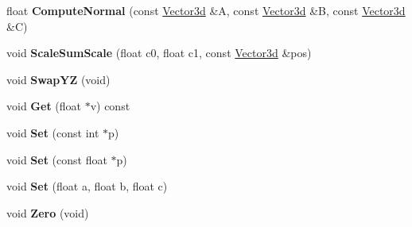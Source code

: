 \begin{DoxyCompactItemize}
\item 
\hypertarget{class_convex_decomposition_1_1_vector3d_aa3cc01dbf155652997caf32c268efef9}{float {\bfseries Compute\+Normal} (const \hyperlink{class_convex_decomposition_1_1_vector3d}{Vector3d} \&A, const \hyperlink{class_convex_decomposition_1_1_vector3d}{Vector3d} \&B, const \hyperlink{class_convex_decomposition_1_1_vector3d}{Vector3d} \&C)}\label{class_convex_decomposition_1_1_vector3d_aa3cc01dbf155652997caf32c268efef9}

\item 
\hypertarget{class_convex_decomposition_1_1_vector3d_a5617b9fe4dd2ad5558161b1421b9ebf5}{void {\bfseries Scale\+Sum\+Scale} (float c0, float c1, const \hyperlink{class_convex_decomposition_1_1_vector3d}{Vector3d} \&pos)}\label{class_convex_decomposition_1_1_vector3d_a5617b9fe4dd2ad5558161b1421b9ebf5}

\item 
\hypertarget{class_convex_decomposition_1_1_vector3d_aa1d8785a482146da392b9a091f073f6b}{void {\bfseries Swap\+Y\+Z} (void)}\label{class_convex_decomposition_1_1_vector3d_aa1d8785a482146da392b9a091f073f6b}

\item 
\hypertarget{class_convex_decomposition_1_1_vector3d_a4957df8b046fb0f7035df0b6a9cf2688}{void {\bfseries Get} (float $\ast$v) const }\label{class_convex_decomposition_1_1_vector3d_a4957df8b046fb0f7035df0b6a9cf2688}

\item 
\hypertarget{class_convex_decomposition_1_1_vector3d_a4bc5892dad8dc72aa18ae98a37f4360d}{void {\bfseries Set} (const int $\ast$p)}\label{class_convex_decomposition_1_1_vector3d_a4bc5892dad8dc72aa18ae98a37f4360d}

\item 
\hypertarget{class_convex_decomposition_1_1_vector3d_ab1458a483fe56ee7e32b2eb3f5b4385a}{void {\bfseries Set} (const float $\ast$p)}\label{class_convex_decomposition_1_1_vector3d_ab1458a483fe56ee7e32b2eb3f5b4385a}

\item 
\hypertarget{class_convex_decomposition_1_1_vector3d_a11cd6bed3356d3a364345e5f5ecdbd95}{void {\bfseries Set} (float a, float b, float c)}\label{class_convex_decomposition_1_1_vector3d_a11cd6bed3356d3a364345e5f5ecdbd95}

\item 
\hypertarget{class_convex_decomposition_1_1_vector3d_a93ecb8b204e73367140375facd00a7c7}{void {\bfseries Zero} (void)}\label{class_convex_decomposition_1_1_vector3d_a93ecb8b204e73367140375facd00a7c7}


\end{DoxyCompactItemize}
